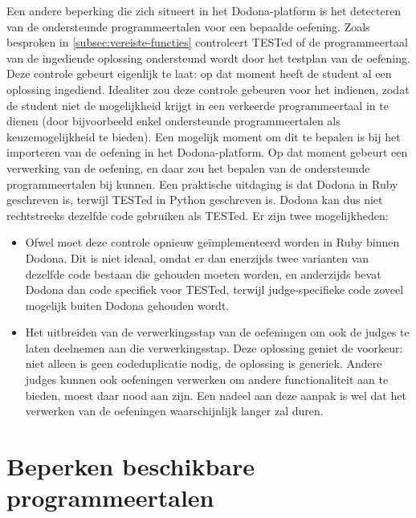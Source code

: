 Een andere beperking die zich situeert in het Dodona-platform is het detecteren van de ondersteunde programmeertalen voor een bepaalde oefening.
Zoals besproken in \cref{subsec:vereiste-functies} controleert TESTed of de programmeertaal van de ingediende oplossing ondersteund wordt door het testplan van de oefening.
Deze controle gebeurt eigenlijk te laat: op dat moment heeft de student al een oplossing ingediend.
Idealiter zou deze controle gebeuren voor het indienen, zodat de student niet de mogelijkheid krijgt in een verkeerde programmeertaal in te dienen (door bijvoorbeeld enkel ondersteunde programmeertalen als keuzemogelijkheid te bieden).
Een mogelijk moment om dit te bepalen is bij het importeren van de oefening in het Dodona-platform.
Op dat moment gebeurt een verwerking van de oefening, en daar zou het bepalen van de ondersteunde programmeertalen bij kunnen.
Een praktische uitdaging is dat Dodona in Ruby geschreven is, terwijl TESTed in Python geschreven is.
Dodona kan dus niet rechtstreeks dezelfde code gebruiken als TESTed.
Er zijn twee mogelijkheden:
\begin{itemize}
    \item Ofwel moet deze controle opnieuw geïmplementeerd worden in Ruby binnen Dodona.
    Dit is niet ideaal, omdat er dan enerzijds twee varianten van dezelfde code bestaan die  gehouden moeten worden, en anderzijds bevat Dodona dan code specifiek voor TESTed, terwijl judge-specifieke code zoveel mogelijk buiten Dodona gehouden wordt.
    \item Het uitbreiden van de verwerkingsstap van de oefeningen om ook de judges te laten deelnemen aan die verwerkingsstap.
    Deze oplossing geniet de voorkeur: niet alleen is geen codeduplicatie nodig, de oplossing is generiek.
    Andere judges kunnen ook oefeningen verwerken om andere functionaliteit aan te bieden, moest daar nood aan zijn.
    Een nadeel aan deze aanpak is wel dat het verwerken van de oefeningen waarschijnlijk langer zal duren.
\end{itemize}

\section{Beperken beschikbare programmeertalen}\label{sec:instellen-ondersteunde-programmeertalen}

